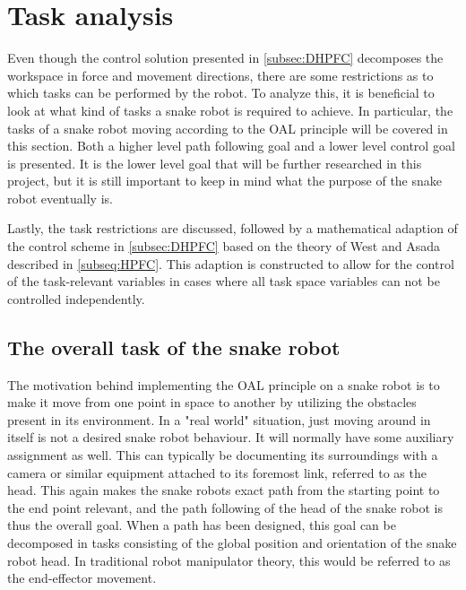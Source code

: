 



\section{Task analysis}

Even though the control solution presented in \ref{subsec:DHPFC} decomposes the workspace in force and movement directions, there are some restrictions as to which tasks can be performed by the robot. To analyze this, it is beneficial to look at what kind of tasks a snake robot is required to achieve. In particular, the tasks of a snake robot moving according to the OAL principle will be covered in this section. Both a higher level path following goal and a lower level control goal is presented. It is the lower level goal that will be further researched in this project, but it is still important to keep in mind what the purpose of the snake robot eventually is.

Lastly, the task restrictions are discussed, followed by a mathematical adaption of the control scheme in \ref{subsec:DHPFC} based on the theory of West and Asada \cite{west1985method} described in \ref{subseq:HPFC}. This adaption is constructed to allow for the control of the task-relevant variables in cases where all task space variables can not be controlled independently.

\subsection{The overall task of the snake robot}

The motivation behind implementing the OAL principle on a snake robot is to make it move from one point in space to another by utilizing the obstacles present in its environment. In a "real world" situation, just moving around in itself is not a desired snake robot behaviour. It will normally have some auxiliary assignment as well. This can typically be documenting its surroundings with a camera or similar equipment attached to its foremost link, referred to as the head. This again makes the snake robots exact path from the starting point to the end point relevant, and the path following of the head of the snake robot is thus the overall goal. When a path has been designed, this goal can be decomposed in tasks consisting of the global position and orientation of the snake robot head. In traditional robot manipulator theory, this would be referred to as the end-effector movement. 


